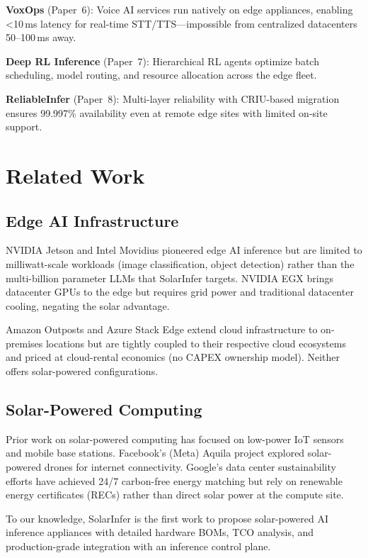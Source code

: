 \documentclass[conference,10pt,letterpaper]{IEEEtran}
\begin{document}
\textbf{VoxOps} (Paper~6): Voice AI services run natively on edge appliances, enabling \textless10\,ms latency for real-time STT/TTS---impossible from centralized datacenters 50--100\,ms away.

\textbf{Deep RL Inference} (Paper~7): Hierarchical RL agents optimize batch scheduling, model routing, and resource allocation across the edge fleet.

\textbf{ReliableInfer} (Paper~8): Multi-layer reliability with CRIU-based migration ensures 99.997\% availability even at remote edge sites with limited on-site support.





\section{Related Work}
\label{sec:related}

\subsection{Edge AI Infrastructure}

NVIDIA Jetson and Intel Movidius pioneered edge AI inference but are limited to milliwatt-scale workloads (image classification, object detection) rather than the multi-billion parameter LLMs that SolarInfer targets. NVIDIA EGX brings datacenter GPUs to the edge but requires grid power and traditional datacenter cooling, negating the solar advantage.

Amazon Outposts and Azure Stack Edge extend cloud infrastructure to on-premises locations but are tightly coupled to their respective cloud ecosystems and priced at cloud-rental economics (no CAPEX ownership model). Neither offers solar-powered configurations.

\subsection{Solar-Powered Computing}

Prior work on solar-powered computing has focused on low-power IoT sensors and mobile base stations. Facebook's (Meta) Aquila project explored solar-powered drones for internet connectivity. Google's data center sustainability efforts have achieved 24/7 carbon-free energy matching but rely on renewable energy certificates (RECs) rather than direct solar power at the compute site.

To our knowledge, SolarInfer is the first work to propose solar-powered AI inference appliances with detailed hardware BOMs, TCO analysis, and production-grade integration with an inference control plane.
\end{document}
